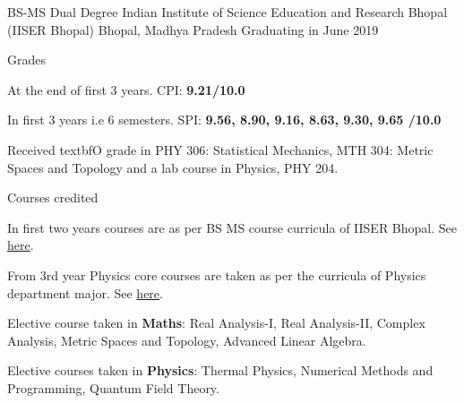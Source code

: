 



\begin{cventries}


\cventry
{BS-MS Dual Degree} %
{Indian Institute of Science Education and Research Bhopal (IISER Bhopal)} %
{ Bhopal, Madhya Pradesh} %
{ Graduating in June 2019} %
{
\begin{cvsubentries}
\cvsubentry
{Grades}
{}
{}
{ %
\begin{cvitems}
\item {At the end of first 3 years. CPI: \textbf{9.21/10.0}}
\item {In first 3 years i.e 6 semesters.   SPI:    \textbf{9.56,  8.90,  9.16,  8.63,  9.30,  9.65  /10.0}}
\item {Received textbf{O} grade in PHY 306: Statistical Mechanics, MTH 304: Metric Spaces and Topology and a lab course in Physics, PHY 204.}
\end{cvitems}
}
\cvsubentry
{Courses credited}
{}
{}
{
\begin{cvitems}
\item {In first two years courses are as per BS MS course curricula of IISER Bhopal. See \href{http://acad.iiserb.ac.in/bsms_core.php}{here}.}
\item {From 3rd year Physics core courses are taken as per the curricula of Physics department major. See \href{http://acad.iiserb.ac.in/bsms_pro_phy.php}{here}.}
\item {Elective course taken in \textbf{Maths}: \break  Real Analysis-I, Real Analysis-II, Complex Analysis, Metric Spaces and Topology, Advanced Linear Algebra.}
\item {Elective courses taken in \textbf{Physics}: \break Thermal Physics, Numerical Methods and Programming, Quantum Field Theory.}
\end{cvitems}
}
\end{cvsubentries}
}
\end{cventries}
